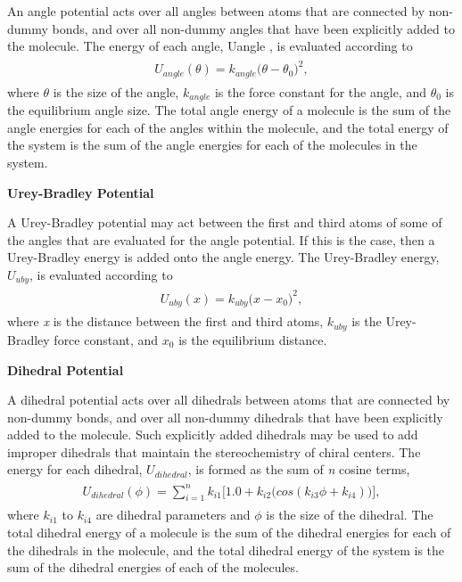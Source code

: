 \documentclass[letterpaper,10pt,english]{sphinxmanual}
\begin{document}
An angle potential acts over all angles between atoms that are connected by non-dummy bonds, and over all
non-dummy angles that have been explicitly added to the molecule. The energy of each angle, Uangle , is evaluated
according to
\label{protoms:equation-angpot}\begin{gather}
\begin{split}U_{angle}(\theta) = k_{angle}\bigl(\theta-\theta_0\bigr)^2,\end{split}\label{protoms-angpot}
\end{gather}
where \(\theta\) is the size of the angle, \(k_{angle}\) is the force constant for the angle, and \(\theta_0\) is the equilibrium angle size. The total angle energy of a molecule is the sum of the angle energies for each of the angles within the molecule, and the total energy of the system is the sum of the angle energies for each of the molecules in the system.

\textbf{Urey-Bradley Potential}

A Urey-Bradley potential may act between the first and third atoms of some of the angles that are evaluated for the angle potential. If this is the case, then a Urey-Bradley energy is added onto the angle energy. The Urey-Bradley energy, \(U_{uby}\), is evaluated according to
\label{protoms:equation-ubpot}\begin{gather}
\begin{split}U_{uby}(x) = k_{uby}\bigl(x-x_0\bigr)^2,\end{split}\label{protoms-ubpot}
\end{gather}
where \emph{x} is the distance between the first and third atoms, \(k_{uby}\) is the Urey-Bradley force constant, and \(x_0\) is the equilibrium distance.

\textbf{Dihedral Potential}

A dihedral potential acts over all dihedrals between atoms that are connected by non-dummy bonds, and over all non-dummy dihedrals that have been explicitly added to the molecule. Such explicitly added dihedrals may be used to add improper dihedrals that maintain the stereochemistry of chiral centers. The energy for each dihedral, \(U_{dihedral}\), is formed as the sum of \emph{n} cosine terms,
\label{protoms:equation-dihepot}\begin{gather}
\begin{split}U_{dihedral}(\phi) = \sum_{i=1}^{n} k_{i1}\bigl[1.0 + k_{i2}\bigl(cos(k_{i3}\phi + k_{i4})\bigr)\bigr],\end{split}\label{protoms-dihepot}
\end{gather}
where \(k_{i1}\) to \(k_{i4}\) are dihedral parameters and \(\phi\) is the size of the dihedral. The total dihedral energy of a molecule is the sum of the dihedral energies for each of the dihedrals in the molecule, and the total dihedral energy of the system is the sum of the dihedral energies of each of the molecules.
\end{document}
